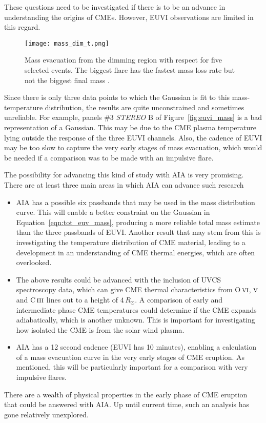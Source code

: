These questions need to be investigated if there is to be an advance in understanding the origins of CMEs. However, EUVI observations are limited in this regard.
\begin{figure}[t!]
\begin{center}
\texttt{[image: mass\_dim\_t.png]}
\caption[Mass evacuation with time]{Mass evacuation from the dimming region with respect for five selected events. The biggest flare has the fastest mass loss rate but not the biggest final mass \citep{aschw09}.}
\label{fig:mass_dim_time}
\end{center}
\end{figure}
Since there is only three data points to which the Gaussian is fit to this mass-temperature distribution, the results are quite unconstrained and sometimes unreliable. For example, panels \#3 \emph{STEREO} B of Figure~\ref{fig:euvi_mass} is a bad representation of a Gaussian. This may be due to the CME plasma temperature lying outside the response of the three EUVI channels. Also, the cadence of EUVI may be too slow to capture the very early stages of mass evacuation, which would be needed if a comparison was to be made with an impulsive flare.

The possibility for advancing this kind of study with AIA is very promising. There are at least three main areas in which AIA can advance such research
\begin{itemize}
\item AIA has a possible six passbands that may be used in the mass distribution curve. This will enable a better constraint on the Gaussian in Equation~\ref{eqn:tot_euv_mass}, producing a more reliable total mass estimate than the three passbands of EUVI. Another result that may stem from this is investigating the temperature distribution of CME material, leading to a development in an understanding of CME thermal energies, which are often overlooked.
\item The above results could be advanced with the inclusion of UVCS spectroscopy data, which can give CME thermal characteristics from O\,$\textsc{vi}$, $\textsc{v}$ and C\,$\textsc{iii}$ lines out to a height of $4\,R_{\odot}$. A comparison of early and intermediate phase CME temperatures could determine if the CME expands adiabatically, which is another unknown. This is important for investigating how isolated the CME is from the solar wind plasma.
\item AIA has a 12 second cadence (EUVI has 10 minutes), enabling a calculation of a mass evacuation curve in the very early stages of CME eruption. As mentioned, this will be particularly important for a comparison with very impulsive flares.
\end{itemize}
There are a wealth of physical properties in the early phase of CME eruption that could be answered with AIA. Up until current time, such an analysis has gone relatively unexplored.

